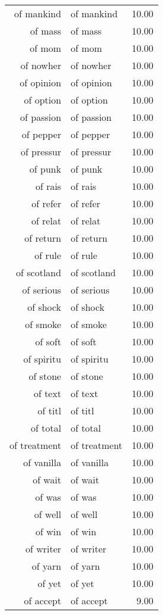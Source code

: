 \begin{table}[ht]
\begin{tabular}{rlr}
  of mankind & of mankind & 10.00 \\ 
  of mass & of mass & 10.00 \\ 
  of mom & of mom & 10.00 \\ 
  of nowher & of nowher & 10.00 \\ 
  of opinion & of opinion & 10.00 \\ 
  of option & of option & 10.00 \\ 
  of passion & of passion & 10.00 \\ 
  of pepper & of pepper & 10.00 \\ 
  of pressur & of pressur & 10.00 \\ 
  of punk & of punk & 10.00 \\ 
  of rais & of rais & 10.00 \\ 
  of refer & of refer & 10.00 \\ 
  of relat & of relat & 10.00 \\ 
  of return & of return & 10.00 \\ 
  of rule & of rule & 10.00 \\ 
  of scotland & of scotland & 10.00 \\ 
  of serious & of serious & 10.00 \\ 
  of shock & of shock & 10.00 \\ 
  of smoke & of smoke & 10.00 \\ 
  of soft & of soft & 10.00 \\ 
  of spiritu & of spiritu & 10.00 \\ 
  of stone & of stone & 10.00 \\ 
  of text & of text & 10.00 \\ 
  of titl & of titl & 10.00 \\ 
  of total & of total & 10.00 \\ 
  of treatment & of treatment & 10.00 \\ 
  of vanilla & of vanilla & 10.00 \\ 
  of wait & of wait & 10.00 \\ 
  of was & of was & 10.00 \\ 
  of well & of well & 10.00 \\ 
  of win & of win & 10.00 \\ 
  of writer & of writer & 10.00 \\ 
  of yarn & of yarn & 10.00 \\ 
  of yet & of yet & 10.00 \\ 
  of accept & of accept & 9.00 \\ 

\end{tabular}
\end{table}
